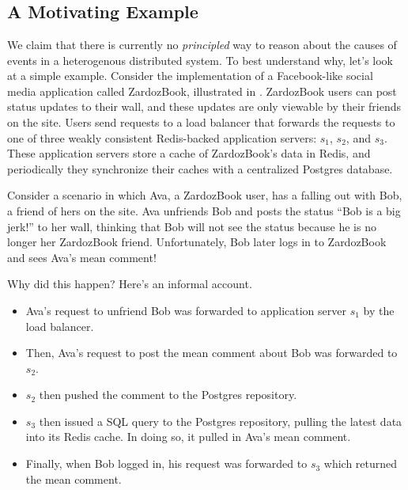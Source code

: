 \section{\WatProvenance{}}

\subsection{A Motivating Example}
\newcommand{\systemname}{ZardozBook}
We claim that there is currently no \emph{principled} 
way to reason about the
causes of events in a heterogenous distributed system. To best understand why,
let's look at a simple example.  Consider the implementation of a Facebook-like
social media application called \systemname{}, illustrated in
. \systemname{} users can post status updates to their wall, and
these updates are only viewable by their friends on the site. Users send
requests to a load balancer that forwards the requests to one of three weakly
consistent Redis-backed application servers: $s_1$, $s_2$, and $s_3$. These
application servers store a cache of \systemname{}'s data in Redis, and
periodically they synchronize their caches with a centralized Postgres
database.

Consider a scenario in which Ava, a \systemname{} user, has a falling out with
Bob, a friend of hers on the site. Ava unfriends Bob and posts the status ``Bob
is a big jerk!'' to her wall, thinking that Bob will not see the status because
he is no longer her \systemname{} friend. Unfortunately, Bob later logs in to
\systemname{} and sees Ava's mean comment!

{}

Why did this happen? Here's an informal account.
\begin{itemize}
  \item
    Ava's request to unfriend Bob was forwarded to application server $s_1$ by
    the load balancer.
  \item
    Then, Ava's request to post the mean comment about Bob was forwarded to
    $s_2$.
  \item
    $s_2$ then pushed the comment to the Postgres repository.
  \item
    $s_3$ then issued a SQL query to the Postgres repository, pulling the
    latest data into its Redis cache. In doing so, it pulled in Ava's mean
    comment.
  \item
    Finally, when Bob logged in, his request was forwarded to $s_3$ which
    returned the mean comment.
\end{itemize}

